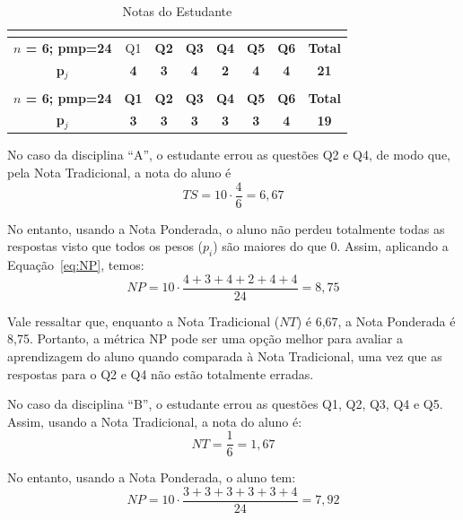 \begin{table}[ht]
\caption{Notas do Estudante}
\centering
\begin{tabular}{|c|c|c|c|c|c|c|c|}
\hline
\multicolumn{8}{|c|}{\cellcolor[HTML]{000000}{\color[HTML]{FFFFFF} \textbf{DISCIPLINA ``A''}}} \\ \hline
\textbf{$n$ = 6; pmp=24} & \cellcolor[HTML]{009901}Q1 & \cellcolor[HTML]{FE0000}\textbf{Q2} & \cellcolor[HTML]{009901}\textbf{Q3} & \cellcolor[HTML]{FE0000}\textbf{Q4} & \cellcolor[HTML]{009901}\textbf{Q5} & \cellcolor[HTML]{009901}\textbf{Q6} & \textbf{Total} \\ \hline
\textbf{p$_j$} & \textbf{4} & \textbf{3} & \textbf{4} & \textbf{2} & \textbf{4} & \textbf{4} & \textbf{21}  \\ \hline
\multicolumn{8}{|c|}{\cellcolor[HTML]{000000}{\color[HTML]{FFFFFF} \textbf{DISCIPLINA ``B''}}} \\ \hline
\textbf{$n$ = 6; pmp=24} & \cellcolor[HTML]{FE0000}\textbf{Q1} & \cellcolor[HTML]{FE0000}\textbf{Q2} & \cellcolor[HTML]{FE0000}\textbf{Q3} & \cellcolor[HTML]{FE0000}\textbf{Q4} & \cellcolor[HTML]{FE0000}\textbf{Q5} & \cellcolor[HTML]{009901}\textbf{Q6} & \textbf{Total} \\ \hline
\textbf{p$_j$} & \textbf{3} & \textbf{3} & \textbf{3} & \textbf{3} & \textbf{3} & \textbf{4} & \textbf{19}  \\ \hline
\end{tabular}
\label{tab:notas-estudantes}
\end{table}

No caso da disciplina ``A'', o estudante errou as questões Q2 e Q4, de modo que, pela Nota Tradicional, a nota do aluno é 
$$TS=10\cdot \frac{4}{6}=6,67$$

No entanto, usando a Nota Ponderada, o aluno não perdeu totalmente todas as respostas visto que todos os pesos ($p_i$) são maiores do que 0. Assim, aplicando a Equação~\ref{eq:NP}, temos:
$$NP=10\cdot \frac{4 + 3 + 4 + 2 + 4 + 4}{24} = 8,75$$

Vale ressaltar que, enquanto a Nota Tradicional ($NT$) é 6,67, a Nota Ponderada é 8,75. Portanto, a métrica NP pode ser uma opção melhor para avaliar a aprendizagem do aluno quando comparada à Nota Tradicional, uma vez que as respostas para o Q2 e Q4 não estão totalmente erradas.

No caso da disciplina ``B'', o estudante errou as questões Q1, Q2, Q3, Q4 e Q5. Assim, usando a Nota Tradicional, a nota do aluno é:
$$NT=\frac{1}{6} = 1,67$$

No entanto, usando a Nota Ponderada, o aluno tem:
$$NP=10\cdot \frac{3 + 3 + 3 + 3 + 3 + 4}{24} = 7,92$$

